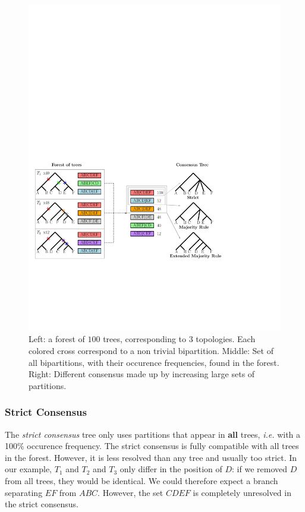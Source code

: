 \begin{figure}
 \includegraphics[width=0.9\linewidth]{Figs/consensus}
 \caption{Left: a forest of $100$ trees, corresponding to $3$ topologies. Each colored cross correspond to a non trivial bipartition. Middle: Set of all bipartitions, with their occurence frequencies, found in the forest. Right: Different consensus made up by increasing large sets of partitions.}
 \label{fig:consensus}
\end{figure}

\subsubsection{Strict Consensus}

The \emph{strict consensus} tree \citep{Rohlf1982} only uses partitions that appear in \textbf{all} trees, \emph{i.e.} with a 100\% occurence frequency. The strict consensus is fully compatible with all trees in the forest. However, it is less resolved than any tree and usually too strict. In our example, $T_1$ and $T_2$ and $T_3$ only differ in the position of $D$: if we removed $D$ from all trees, they would be identical. We could therefore expect a branch separating $EF$ from $ABC$. However, the set $CDEF$ is completely unresolved in the strict consensus. 

